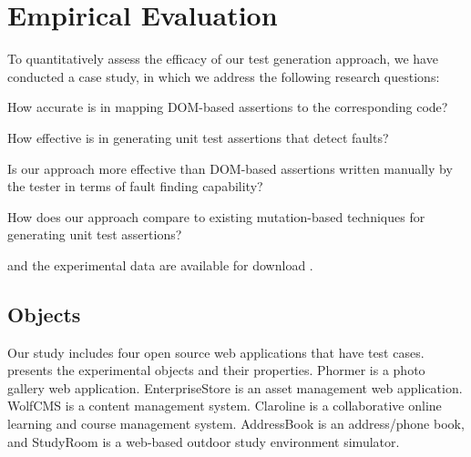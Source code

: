 \section{Empirical Evaluation} \label{Sec:evaluation}
To quantitatively assess the efficacy of our test generation approach, we have conducted a case study, in which we address the following research questions:

\begin{description}[noitemsep]
\item [RQ1] How accurate is \tool in mapping DOM-based assertions to the corresponding \javascript code?
\item [RQ2] How effective is \tool in generating unit test assertions that detect faults?
\item [RQ3] Is our approach more effective than DOM-based assertions written manually by the tester in terms of fault finding capability? 
\item [RQ4] How does our approach compare to existing mutation-based techniques for generating unit test assertions?
\end{description}

\tool and the experimental data are available for download \cite{atrina-dl}.
\subsection{Objects}
Our study includes four open source \javascript web applications that have \selenium test cases.
 presents the experimental objects and their properties. Phormer \cite{phormer} is a photo gallery web application. EnterpriseStore \cite{enterpriseStore} is an asset management web application. WolfCMS \cite{wolfcms} is a content management system. Claroline \cite{claroline} is a collaborative online learning and course management system.
AddressBook \cite{addressBook} is an address/phone book, and StudyRoom \cite{studyRoom} is a web-based outdoor study environment simulator. 

